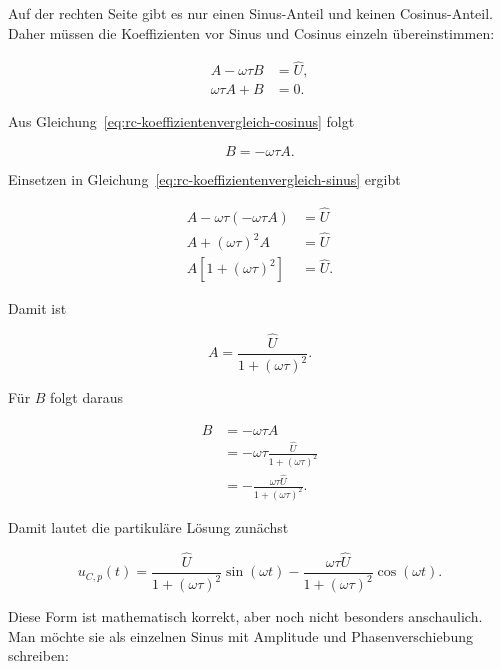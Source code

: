 Auf der rechten Seite gibt es nur einen Sinus-Anteil und keinen Cosinus-Anteil.
Daher müssen die Koeffizienten vor Sinus und Cosinus einzeln übereinstimmen:

\begin{align}
	A-\omega\tau B &= \hat{U},
	\label{eq:rc-koeffizientenvergleich-sinus} \\[4pt]
	\omega\tau A+B &= 0.
	\label{eq:rc-koeffizientenvergleich-cosinus}
\end{align}

Aus Gleichung~\eqref{eq:rc-koeffizientenvergleich-cosinus} folgt

\begin{equation}
	B = -\omega\tau A.
	\label{eq:rc-b-in-abhaengigkeit-von-a}
\end{equation}

Einsetzen in Gleichung~\eqref{eq:rc-koeffizientenvergleich-sinus} ergibt

\begin{align}
	A-\omega\tau(-\omega\tau A)
	&=
	\hat{U}
	\\[4pt]
	A+(\omega\tau)^2A
	&=
	\hat{U}
	\\[4pt]
	A\left[1+(\omega\tau)^2\right]
	&=
	\hat{U}.
	\label{eq:rc-bestimmung-von-a}
\end{align}

Damit ist

\begin{equation}
	A
	=
	\frac{\hat{U}}{1+(\omega\tau)^2}.
	\label{eq:rc-koeffizient-a}
\end{equation}

Für \(B\) folgt daraus

\begin{align}
	B
	&=
	-\omega\tau A
	\\[4pt]
	&=
	-\omega\tau
	\frac{\hat{U}}{1+(\omega\tau)^2}
	\\[4pt]
	&=
	-\frac{\omega\tau\hat{U}}{1+(\omega\tau)^2}.
	\label{eq:rc-koeffizient-b}
\end{align}

Damit lautet die partikuläre Lösung zunächst

\begin{equation}
	u_{C,p}(t)
	=
	\frac{\hat{U}}{1+(\omega\tau)^2}\sin(\omega t)
	-
	\frac{\omega\tau\hat{U}}{1+(\omega\tau)^2}\cos(\omega t).
	\label{eq:rc-partikulaere-loesung-sinus-cosinus}
\end{equation}

Diese Form ist mathematisch korrekt, aber noch nicht besonders anschaulich.
Man möchte sie als einzelnen Sinus mit Amplitude und Phasenverschiebung
schreiben:

